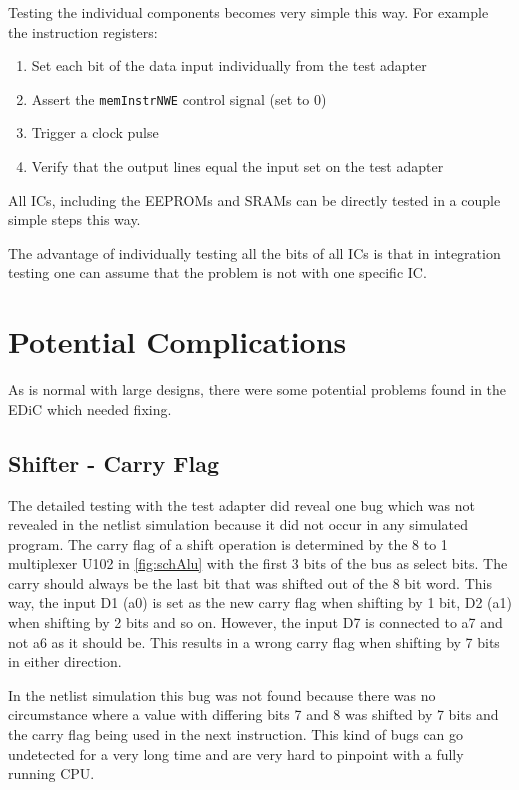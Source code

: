 Testing the individual components becomes very simple this way.
For example the instruction registers:
\begin{enumerate}
  \item Set each bit of the data input individually from the test adapter
  \item Assert the \texttt{memInstrNWE} control signal (set to 0)
  \item Trigger a clock pulse
  \item Verify that the output lines equal the input set on the test adapter
\end{enumerate}
All \glspl{IC}, including the \glspl{EEPROM} and \glspl{SRAM} can be directly tested in a couple simple steps this way.

The advantage of individually testing all the bits of all \glspl{IC} is that in integration testing one can assume that the problem is not with one specific \gls{IC}.
\section{Potential Complications}\label{sec:switchGlitch}
As is normal with large designs, there were some potential problems found in the \gls{EDiC} which needed fixing.
\subsection{Shifter - Carry Flag}
The detailed testing with the test adapter did reveal one bug which was not revealed in the netlist simulation because it did not occur in any simulated program.
The carry flag of a shift operation is determined by the 8 to 1 multiplexer U102 in \cref{fig:schAlu} with the first 3 bits of the bus as select bits.
The carry should always be the last bit that was shifted out of the 8 bit word.
This way, the input D1 (a0) is set as the new carry flag when shifting by 1 bit, D2 (a1) when shifting by 2 bits and so on.
However, the input D7 is connected to a7 and not a6 as it should be.
This results in a wrong carry flag when shifting by 7 bits in either direction.

In the netlist simulation this bug was not found because there was no circumstance where a value with differing bits 7 and 8 was shifted by 7 bits and the carry flag being used in the next instruction.
This kind of bugs can go undetected for a very long time and are very hard to pinpoint with a fully running \gls{CPU}.

